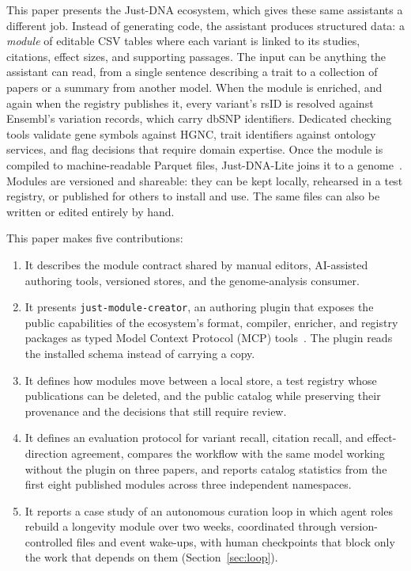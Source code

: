 \documentclass[11pt,a4paper]{article}
\begin{document}
This paper presents the Just-DNA ecosystem, which gives these same assistants a
different job. Instead of generating code, the assistant produces structured
data: a \emph{module} of editable CSV tables where each variant is linked to its
studies, citations, effect sizes, and supporting passages. The input can be
anything the assistant can read, from a single sentence describing a trait to a
collection of papers or a summary from another model. When the module is
enriched, and again when the registry publishes it, every variant's rsID is
resolved against Ensembl's variation records, which carry dbSNP identifiers.
Dedicated checking tools validate
gene symbols against HGNC, trait identifiers against ontology services, and flag
decisions that require domain expertise.
Once the module is compiled to machine-readable Parquet files, Just-DNA-Lite
joins it to a genome~\citep{companion2026justdnalite}. Modules are versioned and
shareable: they can be kept locally, rehearsed in a test registry, or
published for others to install and use. The same files can also be written or
edited entirely by hand.

This paper makes five contributions:

\begin{enumerate}
    \item It describes the module contract shared by manual editors, AI-assisted
    authoring tools, versioned stores, and the genome-analysis consumer.
    \item It presents \texttt{just-module-creator}, an authoring plugin that
    exposes the public capabilities of the ecosystem's format, compiler,
    enricher, and registry packages as typed Model Context Protocol (MCP)
    tools~\citep{anthropic2024mcp}.
    The plugin reads the installed schema instead of carrying a copy.
    \item It defines how modules move between a local store, a test registry
    whose publications can be deleted, and the public catalog while
    preserving their provenance and the
    decisions that still require review.
    \item It defines an evaluation protocol for variant recall, citation
    recall, and effect-direction agreement, compares the workflow with the
    same model working without the plugin on three papers, and reports catalog statistics
    from the first eight published modules across three independent namespaces.
    \item It reports a case study of an autonomous curation loop in which
    agent roles rebuild a longevity module over two weeks, coordinated through
    version-controlled files and event wake-ups, with human checkpoints that
    block only the work that depends on them (Section~\ref{sec:loop}).
\end{enumerate}
\end{document}

